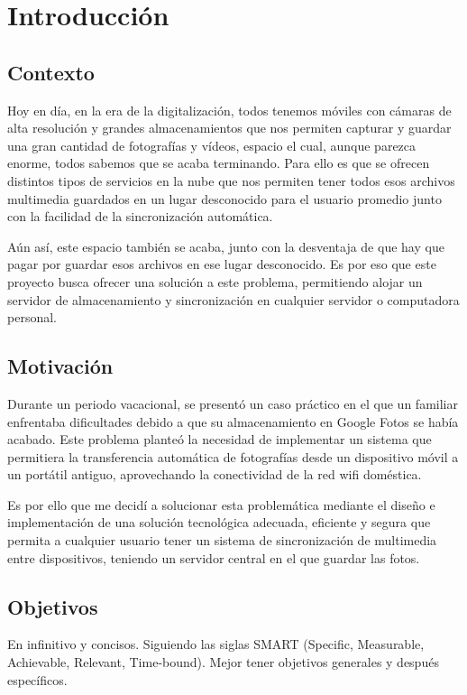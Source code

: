 \section{Introducción}

\subsection{Contexto}
Hoy en día, en la era de la digitalización, todos tenemos móviles con cámaras de alta resolución y grandes almacenamientos que nos permiten capturar y guardar una gran cantidad de fotografías y vídeos, espacio el cual, aunque parezca enorme, todos sabemos que se acaba terminando. Para ello es que se ofrecen distintos tipos de servicios en la nube que nos permiten tener todos esos archivos multimedia guardados en un lugar desconocido para el usuario promedio junto con la facilidad de la sincronización automática.

Aún así, este espacio también se acaba, junto con la desventaja de que hay que pagar por guardar esos archivos en ese lugar desconocido. Es por eso que este proyecto busca ofrecer una solución a este problema, permitiendo alojar un servidor de almacenamiento y sincronización en cualquier servidor o computadora personal.

\subsection{Motivación}
Durante un periodo vacacional, se presentó un caso práctico en el que un familiar enfrentaba dificultades debido a que su almacenamiento en Google Fotos se había acabado. Este problema planteó la necesidad de implementar un sistema que permitiera la transferencia automática de fotografías desde un dispositivo móvil a un portátil antiguo, aprovechando la conectividad de la red wifi doméstica.

Es por ello que me decidí a solucionar esta problemática mediante el diseño e implementación de una solución tecnológica adecuada, eficiente y segura que permita a cualquier usuario tener un sistema de sincronización de multimedia entre dispositivos, teniendo un servidor central en el que guardar las fotos.

\subsection{Objetivos}
En infinitivo y concisos. Siguiendo las siglas SMART (Specific, Measurable, Achievable, Relevant, Time-bound).
Mejor tener objetivos generales y después específicos.

